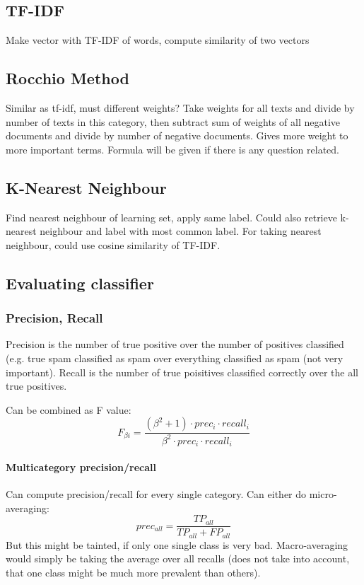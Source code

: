 \documentclass[11pt]{article}
\begin{document}
\subsection{TF-IDF }
Make vector with TF-IDF of words, compute similarity of two vectors

\subsection{Rocchio Method}
Similar as tf-idf, must different weights? Take weights for all texts and divide by number
of texts in this category, then subtract sum of weights of all negative documents and divide
by number of negative documents. Gives more weight to more important terms. Formula will be
given if there is any question related.

\subsection{K-Nearest Neighbour}
Find nearest neighbour of learning set, apply same label. Could also retrieve k-nearest
neighbour and label with most common label. For taking nearest neighbour, could use cosine
similarity of TF-IDF.

\subsection{Evaluating classifier}
\subsubsection{Precision, Recall}
Precision is the number of true positive over the number of positives classified
(e.g. true spam classified as spam over everything classified as spam (not very important).
Recall is the number of true poisitives classified correctly over the all true positives.

Can be combined as F value:
\begin{equation}
	F_{\beta i} = \frac{(\beta^2 + 1)\cdot prec_i \cdot recall_i}{\beta^2 \cdot prec_i \cdot recall_i}
\end{equation}
\paragraph{Multicategory precision/recall}
Can compute precision/recall for every single category. Can either do micro-averaging:
\begin{equation}
	prec_{all} = \frac{TP_{all}}{TP_{all} + FP_{all}}
\end{equation}
But this might be tainted, if only one single class is very bad. Macro-averaging would simply be taking the average over all recalls (does not take into
account, that one class might be much more prevalent than others). 
\end{document}

